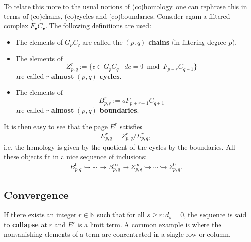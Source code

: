     To relate this more to the usual notions of (co)homology, one can rephrase this in terms of (co)chains, (co)cycles and (co)boundaries. Consider again a filtered complex $F_\bullet C_\bullet$. The following definitions are used:
    \begin{itemize}
        \item The elements of $G_pC_q$ are called the $(p,q)$-\textbf{chains} (in filtering degree $p$).
        \item The elements of \[Z^r_{p,q} := \{c\in G_pC_q\mid dc=0\bmod F_{p-r}C_{q-1}\}\] are called $r$-\textbf{almost} $(p,q)$-\textbf{cycles}.
        \item The elements of \[B^r_{p,q} := dF_{p+r-1}C_{q+1}\] are called $r$-\textbf{almost} $(p,q)$-\textbf{boundaries}.
    \end{itemize}
    It is then easy to see that the page $E^r$ satisfies
    \begin{gather}
        E^r_{p,q} = Z^r_{p,q}/B^r_{p,q},
    \end{gather}
    i.e. the homology is given by the quotient of the cycles by the boundaries. All these objects fit in a nice sequence of inclusions:
    \begin{gather}
        B^0_{p,q}\hookrightarrow\cdots\hookrightarrow B^\infty_{p,q}\hookrightarrow Z^\infty_{p,q}\hookrightarrow\cdots\hookrightarrow Z^0_{p,q}.
    \end{gather}

\subsection{Convergence}

    \begin{example}
        If there exists an integer $r\in\mathbb{N}$ such that for all $s\geq r:d_s=0$, the sequence is said to \textbf{collapse} at $r$ and $E^r$ is a limit term. A common example is where the nonvanishing elements of a term are concentrated in a single row or column.
    \end{example}

